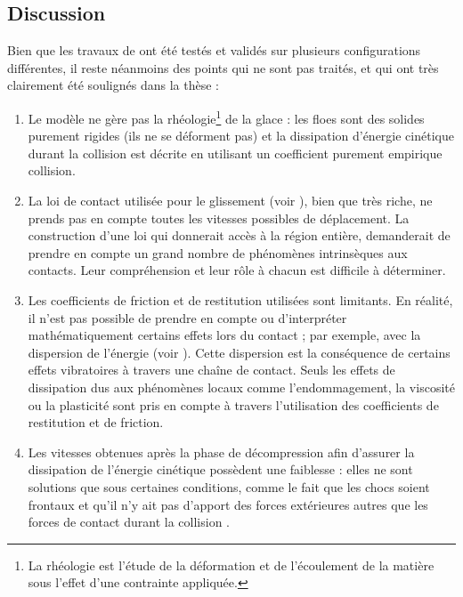 \subsection{Discussion}
Bien que les travaux de \citeauthor{rabatel2015thesis} ont été testés et validés sur plusieurs configurations différentes, il reste néanmoins des points qui ne sont pas traités, et qui ont très clairement été soulignés dans la thèse \parencite{rabatel2015thesis} :
\begin{enumerate}
    \item Le modèle ne gère pas la rhéologie\footnote{La rhéologie est l'étude de la déformation et de l'écoulement de la matière sous l'effet d'une contrainte appliquée.} de la glace : les floes sont des solides purement rigides (ils ne se déforment pas) et la dissipation d’énergie cinétique durant la collision est décrite en utilisant un coefficient purement empirique collision.  
    \item La loi de contact utilisée pour le glissement (voir \parencite{stewart1996implicit}), bien que très riche, ne prends pas en compte toutes les vitesses possibles de déplacement. La construction d’une loi qui donnerait accès à la région entière, demanderait de prendre en compte un grand nombre de phénomènes intrinsèques aux contacts. Leur compréhension et leur rôle à chacun est difficile à déterminer. 
    \item Les coefficients de friction et de restitution utilisées sont limitants. En réalité, il n’est pas possible de prendre en compte ou d'interpréter mathématiquement certains effets lors du contact ; par exemple, avec la dispersion de l'énergie (voir \parencite{nguyen2014multiple}). Cette dispersion est la conséquence de certains effets vibratoires à travers une chaîne de contact. Seuls les effets de dissipation dus aux phénomènes locaux comme l’endommagement, la viscosité ou la plasticité sont pris en compte à travers l’utilisation des coefficients de restitution et de friction.
    \item Les vitesses obtenues après la phase de décompression afin d'assurer la dissipation de l'énergie cinétique possèdent une faiblesse : elles ne sont solutions que sous certaines conditions, comme le fait que les chocs soient frontaux et qu’il n’y ait pas d’apport des forces extérieures autres que les forces de contact durant la collision \parencite[p.41]{rabatel2015thesis}.
\end{enumerate}

















